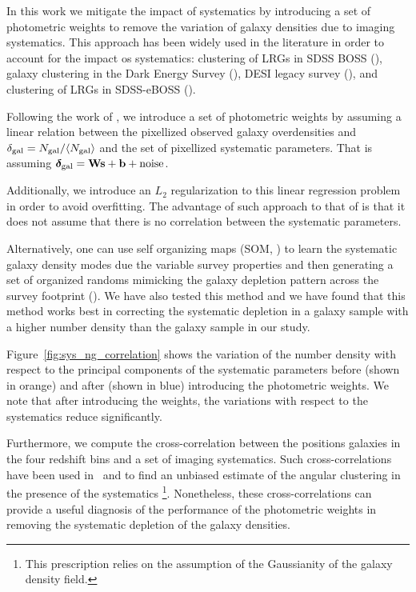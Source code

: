 \documentclass[fleqn,usenatbib,useAMS]{mnras}
\begin{document}
In this work we mitigate the impact of systematics by introducing a set of photometric weights to remove the variation of galaxy densities due to imaging systematics. This approach has been widely used in the literature in order to account for the impact os systematics: clustering of LRGs in SDSS BOSS (\citealt{ross2012clustering, ross2017clustering}), galaxy clustering in the Dark Energy Survey (\citealt{elvin2017,crocce2019dark}), DESI legacy survey (\citealt{DESI_systematic}), and clustering of LRGs in SDSS-eBOSS (\citealt{bautista2018sdss, icaza2020clustering}). 

Following the work of \citet{bautista2018sdss}, we introduce a set of photometric weights by assuming a linear relation between the pixellized observed galaxy overdensities and $\delta_{\rm gal} = N_{\rm gal}/\langle N_{\rm gal}\rangle$ and the set of pixellized systematic parameters. That is assuming $\boldsymbol{\delta}_{\rm gal} = \mathbf{Ws+b} + \mathbf{\mathrm{noise}}$. 

Additionally, we introduce an $L_{2}$ regularization to this linear regression problem in order to avoid overfitting. The advantage of such approach to that of \citet{ross2017clustering} is that it does not assume that there is no correlation between the systematic parameters. 

Alternatively, one can use self organizing maps (SOM, \citealt{kohonen1997}) to learn the systematic galaxy density modes due the variable survey properties and then generating a set of organized randoms mimicking the galaxy depletion pattern across the survey footprint (\citealt{som2020}). We have also tested this method and we have found that this method works best in correcting the systematic depletion in a galaxy sample with a higher number density than the galaxy sample in our study. 

Figure~\ref{fig:sys_ng_correlation} shows the variation of the number density with respect to the principal components of the systematic parameters before (shown in orange) and after (shown in blue) introducing the photometric weights. We note that after introducing the weights, the variations with respect to the systematics reduce significantly.

Furthermore, we compute the cross-correlation between the positions galaxies in the four redshift bins and a set of imaging systematics. Such cross-correlations have been used in~\citet{ho2012} and \citet{crocce2016galaxy} to find an unbiased estimate of the angular clustering in the presence of the systematics \footnote{This prescription relies on the assumption of the Gaussianity of the galaxy density field.}. Nonetheless, these cross-correlations can provide a useful diagnosis of the performance of the photometric weights in removing the systematic depletion of the galaxy densities. 
\end{document}
